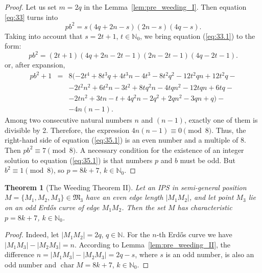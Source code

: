 \documentclass[a4paper,14pt]{article} %
\theoremstyle{plain}
\newtheorem{theorem}{Theorem}[section]
\theoremstyle{definition}
\begin{document}
\begin{proof}
	Let us set $m = 2q$ in the Lemma~\ref{lem:pre_weeding_I}.
	Then equation \eqref{eq:33} turns into
	\begin{equation}
		\label{eq:33.1}
		pb^2 = s(4q + 2n - s)(2n - s)(4q - s).
	\end{equation}
	Taking into account that $s = 2t + 1$, $t \in \mathbb{N}_0$,
	we bring equation (\ref{eq:33.1}) to the form:
	\begin{equation}
	pb^2 = (2t + 1)(4q + 2n - 2t - 1)(2n - 2t - 1)(4q - 2t - 1).
	\label{eq: 34.2}
	\end{equation}
	or, after expansion,
	\begin{eqnarray}
		pb^2 + 1&=& 8(-2t^4+8t^3q+4t^3n-4t^3-8t^2q^2-12t^2qn+12t^2q- {}\nonumber\\
			 &     &-2t^2n^2+6t^2n-3t^2+8tq^2n-4tqn^2-12tqn+6tq- {}\nonumber\\
			 &     &-2tn^2+3tn-t+4q^2n-2q^2+2qn^2-3qn+q)-  {}\nonumber\\
			   &     &-4n(n-1).
		\label{eq:35.1}
	\end{eqnarray}
	Among two consecutive natural numbers $n$ and $(n-1)$,
	exactly one of them is divisible by 2.
	Therefore, the expression $4n(n-1)\equiv0\pmod{8}$.
	Thus, the right-hand side of equation (\ref{eq:35.1}) is an even number and a multiple of 8.
	Then $pb^2\equiv7\pmod{8}$.
	A necessary condition for the existence of an integer solution to equation (\ref{eq:35.1})
	is that numbers $p$ and $b$ must be odd.
	But $b^2\equiv1\pmod{8}$, so $p=8k+7$, $k\in\mathbb{N}_0$.
\end{proof}

\begin{theorem}[The Weeding Theorem II]
	\label{thm:weeding_II}
	Let an IPS in semi-general position $M=\{M_1, M_2, M_3\}\in{\mathfrak{M}_{3}}$ have an even edge length $|M_1 M_2|$, and let point $M_3$ lie on an odd Erdős curve of edge $M_1 M_2$.
	Then the set $M$ has characteristic $p=8k+7$, $k\in \mathbb{N}_{0}$.
\end{theorem}

\begin{proof}
	Indeed, let $|M_1 M_2|=2q$, $q \in \mathbb{N}$.
	For the $n$-th Erdős curve we have $|M_1 M_3|-|M_2 M_3|=n$.
	According to Lemma~\ref{lem:pre_weeding_II}, the difference $n=|M_1 M_3|-|M_2 M_3|=2q-s$,
	where $s$ is an odd number,
	is also an odd number and $\operatorname{char} M = 8k + 7$, $k\in \mathbb{N}_{0}$.
\end{proof}
\end{document}
